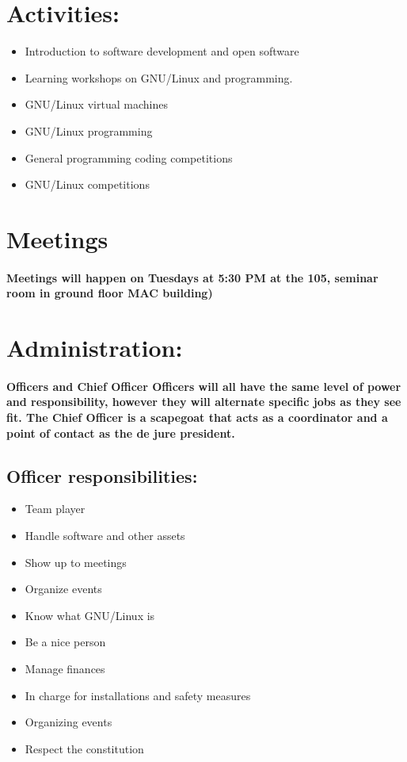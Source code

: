 \documentclass[a4paper, 11pt]{amsart}
\begin{document}
\section{Activities:}
\begin{itemize}
    \item Introduction to software development and open software
  \item Learning workshops on GNU/Linux and programming.
  \item GNU/Linux virtual machines
  \item GNU/Linux programming
  \item General programming coding competitions
  \item GNU/Linux competitions
\end{itemize}




\section{Meetings}
\paragraph{Meetings will happen on Tuesdays at 5:30 PM at the 105, seminar room in ground floor MAC building)}




\section{Administration:}
\paragraph{Officers and Chief Officer
    Officers will all have the same level of power and responsibility, however they will alternate specific jobs as they see fit.
    The Chief Officer is a scapegoat that acts as a coordinator and a point of contact as the de jure president.
}
\subsection{Officer responsibilities:}
\begin{itemize}
    \item Team player
    \item Handle software and other assets
    \item Show up to meetings
    \item Organize events
    \item Know what GNU/Linux is
    \item Be a nice person
    \item Manage finances
    \item In charge for installations and safety measures
    \item  Organizing events
    \item Respect the constitution
\end{itemize}
\end{document}
